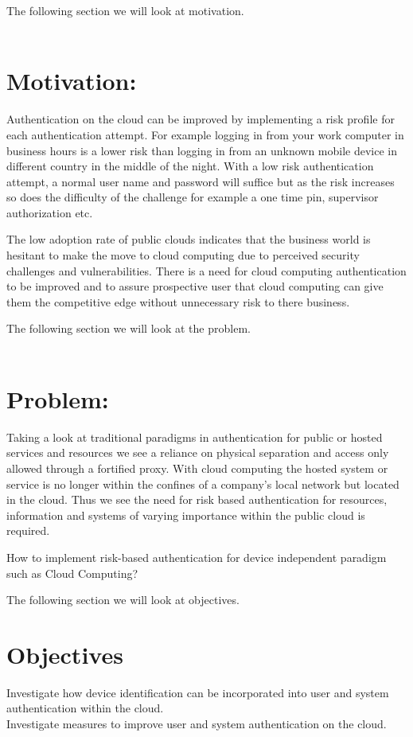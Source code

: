 \documentclass[11pt]{article}
\begin{document}
The following section we will look at motivation.
\\ \\

\section{Motivation:}
Authentication on the cloud can be improved by implementing a risk profile for each authentication attempt. For example logging in from your work computer in business hours is a lower risk than logging in from an unknown mobile device in different country in the middle of the night. With a low risk authentication attempt, a normal user name and password will suffice but as the risk increases so does the difficulty of the challenge for example a one time pin, supervisor authorization etc.

The low adoption rate of public clouds indicates that the business world is hesitant to make the move to cloud computing due to perceived security challenges and vulnerabilities. There is a need for cloud computing authentication to be improved and to assure prospective user that cloud computing can give them the competitive edge without unnecessary risk to there business. 

The following section we will look at the problem. 
\\ \\


\section{Problem:}
Taking a look at traditional paradigms in authentication for public or hosted services and resources we see a reliance on physical separation and access only allowed through a fortified proxy. With cloud computing the hosted system or service is no longer within the confines of a company's local network but located in the cloud. Thus we see the need for risk based authentication for resources, information and systems of varying importance within the public cloud is required.  

How to implement risk-based authentication for device independent paradigm such as Cloud Computing? 

The following section we will look at objectives.

\section{Objectives}
Investigate how device identification can be incorporated into user and system authentication within the cloud. \\
Investigate measures to improve user and system authentication on the
cloud.




\end{document}

